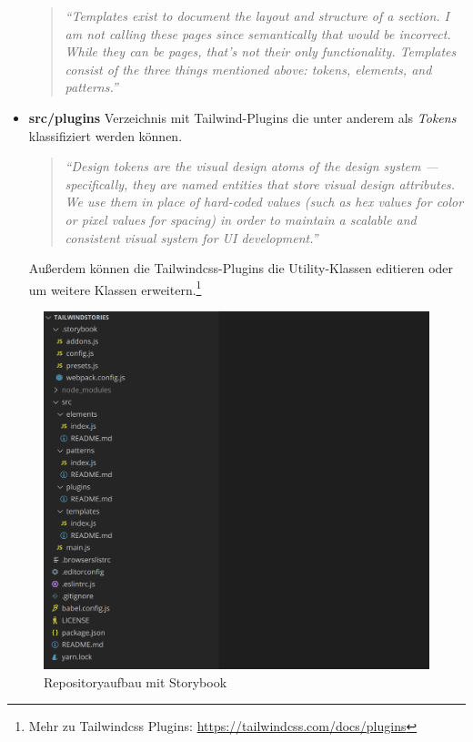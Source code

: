 \begin{itemize}
    \begin{quotation}
        \emph{``Templates exist to document the layout and structure of a section. I am not calling these pages since semantically that would be incorrect. While they can be pages, that’s not their only functionality. Templates consist of the three things mentioned above: tokens, elements, and patterns.''} \citep{VUEDSTemplates}
    \end{quotation}
    \item \textbf{src/plugins}\newline
    Verzeichnis mit Tailwind-Plugins die unter anderem als \textit{Tokens} klassifiziert werden können.
    \begin{quotation}
        \emph{``Design tokens are the visual design atoms of the design system — specifically, they are named entities that store visual design attributes. We use them in place of hard-coded values (such as hex values for color or pixel values for spacing) in order to maintain a scalable and consistent visual system for UI development.''} \citep{DesignTokens}
    \end{quotation}
    Außerdem können die Tailwindcss-Plugins die Utility-Klassen editieren oder um weitere Klassen erweitern.\footnote{Mehr zu Tailwindcss Plugins: \url{https://tailwindcss.com/docs/plugins}}
\end{itemize}

\begin{figure}[!ht]
	\centering
		\includegraphics[width=.85\textwidth]{images/004-000-001-repo-storybook.png}
	\caption{Repositoryaufbau mit Storybook}
	\label{fig:repoStorybook}
\end{figure}


